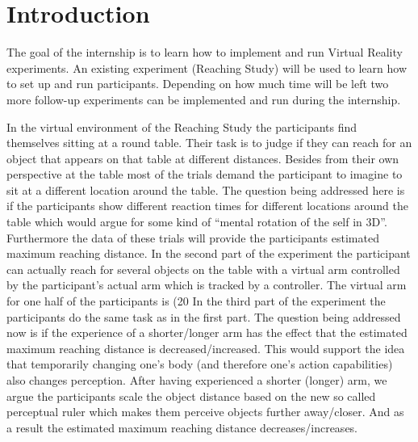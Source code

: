 \section{Introduction} \label{sec:introduction}

The goal of the internship is to learn how to implement and run Virtual Reality experiments. An existing experiment (Reaching Study) will be used to learn how to set up and run participants. Depending on how much time will be left two more follow-up experiments can be implemented and run during the internship.

In the virtual environment of the Reaching Study the participants find themselves sitting at a round table. Their task is to judge if they can reach for an object that appears on that table at different distances. Besides from their own perspective at the table most of the trials demand the participant to imagine to sit at a different location around the table. The question being addressed here is if the participants show different reaction times for different locations around the table which would argue for some kind of “mental rotation of the self in 3D”. Furthermore the data of these trials will provide the participants estimated maximum reaching distance. 
In the second part of the experiment the participant can actually reach for several objects on the table with a virtual arm controlled by the participant’s actual arm which is tracked by a controller. The virtual arm for one half of the participants is (20%
In the third part of the experiment the participants do the same task as in the first part. The question being addressed now is if the experience of a shorter/longer arm has the effect that the estimated maximum reaching distance is decreased/increased. This would support the idea that temporarily changing one’s body (and therefore one’s action capabilities) also changes perception. After having experienced a shorter (longer) arm, we argue the participants scale the object distance based on the new so called perceptual ruler which makes them perceive objects further away/closer. And as a result the estimated maximum reaching distance decreases/increases.